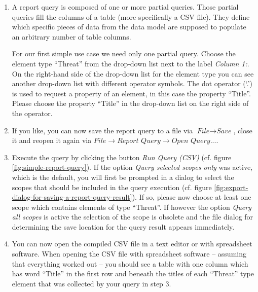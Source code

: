 \documentclass[a4paper,10pt]{book}
\providecommand{\tightlist}{%
  \setlength{\itemsep}{0pt}\setlength{\parskip}{0pt}}
\begin{document}
\begin{enumerate}
\def\labelenumi{\arabic{enumi}.}
\setcounter{enumi}{1}
\tightlist
\item
  A report query is composed of one or more partial queries. Those partial
  queries fill the columns of a table (more specifically a CSV file). They
  define which specific pieces of data from the data model are supposed to
  populate an arbitrary number of table columns.

  For our first simple use case we need only one partial query. Choose the
  element type ``Threat'' from the drop-down list next to the label \emph{Column
  1:}. On the right-hand side of the drop-down list for the element type you can
  see another drop-down list with different operator symbols. The dot operator
  (`.') is used to request a property of an element, in this case the property
  ``Title''. Please choose the property ``Title'' in the drop-down list on the
  right side of the operator.

\item If you like, you can now save the report query to a file via
$\textit{File}\to\textit{Save}$, close it and reopen it again via
$\textit{File}\to\textit{Report Query}\to\textit{Open Query...}$.

\item
  Execute the query by clicking the button \emph{Run Query (CSV)} (cf. figure
  \ref{fig:simple-report-query}). If the option \emph{Query selected scopes
  only} was active, which is the default, you will first be prompted in a dialog
  to select the scopes that should be included in the query execution (cf.
  figure \ref{fig:export-dialog-for-saving-a-report-query-result}). If so,
  please now choose at least one scope which contains elements of type
  ``Threat''. If however the option \emph{Query all scopes} is active the
  selection of the scope is obsolete and the file dialog for determining the
  save location for the query result appears immediately.

\item
  You can now open the compiled CSV file in a text editor or with spreadsheet
  software. When opening the CSV file with spreadsheet software -- assuming that
  everything worked out -- you should see a table with one column which has word
  ``Title'' in the first row and beneath the titles of each ``Threat'' type
  element that was collected by your query in step 3.
\end{enumerate}
\end{document}
